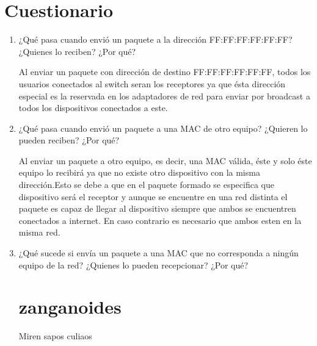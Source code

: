 \documentclass[spanish]{udpreport}
\begin{document}
\chapter{Cuestionario}
\begin{enumerate}

\item¿Qué  pasa  cuando  envió  un  paquete  a  la  dirección  FF:FF:FF:FF:FF:FF?  ¿Quienes 
lo reciben? ¿Por qué?

Al enviar un paquete con dirección de destino FF:FF:FF:FF:FF:FF, todos los usuarios conectados al switch seran los receptores ya que ésta dirección especial es la reservada en los adaptadores de red para enviar por broadcast a todos los dispositivos conectados a este.

\item¿Qué  pasa  cuando  envió  un  paquete  a  una  MAC  de  otro  equipo?  ¿Quieren  lo pueden reciben? ¿Por qué?

Al enviar un paquete a otro equipo, es decir, una MAC válida, éste y solo éste equipo lo recibirá ya que no existe otro dispositivo con la misma dirección.Esto se debe a que en el paquete formado se especifica que dispositivo será el receptor y aunque se encuentre en una red distinta el paquete es capaz de llegar al dispositivo siempre que ambos se encuentren conectados a internet. En caso contrario es necesario que ambos esten en la misma red.

\item¿Qué  sucede  si  envía  un  paquete  a  una  MAC  que  no  corresponda  a  ningún  equipo de la red? ¿Quienes lo pueden recepcionar? ¿Por qué?

\chapter{zanganoides}
Miren sapos culiaos

\end{enumerate}
\end{document}

